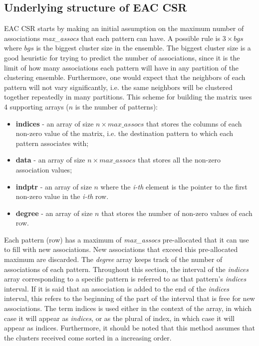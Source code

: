 
\subsection{Underlying structure of EAC CSR}

\noindent EAC CSR starts by making an initial assumption on the maximum number of associations \emph{max\_assocs} that each pattern can have.
A possible rule is $3 \times bgs$ where $bgs$ is the biggest cluster size in the ensemble.
The biggest cluster size is a good heuristic for trying to predict the number of associations, since it is the limit of how many associations each pattern will have in any partition of the clustering ensemble.
Furthermore, one would expect that the neighbors of each pattern will not vary significantly, i.e. the same neighbors will be clustered together repeatedly in many partitions.
This scheme for building the matrix uses 4 supporting arrays ($n$ is the number of patterns):

\begin{itemize}
	\item \textbf{indices} - an array of size $n \times max\_assocs$ that stores the columns of each non-zero value of the matrix, i.e. the destination pattern to which each pattern associates with;
	\item \textbf{data} - an array of size $n \times max\_assocs$ that stores all the non-zero association values;
	\item \textbf{indptr} - an array of size $n$  where the \emph{i-th} element is the pointer to the first non-zero value in the \emph{i-th} row.
	\item \textbf{degree} - an array of size $n$  that stores the number of non-zero values of each row.
\end{itemize}

Each pattern (row) has a maximum of \emph{max\_assocs} pre-allocated that it can use to fill with new associations.
New associations that exceed this pre-allocated maximum are discarded.
The \emph{degree} array keeps track of the number of associations of each pattern.
Throughout this section, the interval of the \emph{indices} array corresponding to a specific pattern is referred to as that pattern's \emph{indices} interval.
If it is said that an association is added to the end of the \emph{indices} interval, this refers to the beginning of the part of the interval that is free for new associations.
The term indices is used either in the context of the array, in which case it will appear as \emph{indices}, or as the plural of index, in which case it will appear as indices.
Furthermore, it should be noted that this method assumes that the clusters received come sorted in a increasing order.

